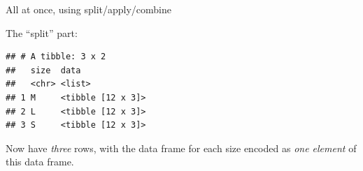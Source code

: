 \documentclass[
  ignorenonframetext,
]{beamer}
\newenvironment{Shaded}{\begin{snugshade}}{\end{snugshade}}
\newcommand{\KeywordTok}[1]{\textcolor[rgb]{0.13,0.29,0.53}{\textbf{#1}}}
\newcommand{\NormalTok}[1]{#1}
\newcommand{\OperatorTok}[1]{\textcolor[rgb]{0.81,0.36,0.00}{\textbf{#1}}}
\newcommand{\StringTok}[1]{\textcolor[rgb]{0.31,0.60,0.02}{#1}}
\begin{document}
\begin{frame}[fragile]{All at once, using split/apply/combine}
\protect\hypertarget{all-at-once-using-splitapplycombine}{}

The ``split'' part:

\begin{Shaded}
\end{Shaded}

\begin{verbatim}
## # A tibble: 3 x 2
##   size  data             
##   <chr> <list>           
## 1 M     <tibble [12 x 3]>
## 2 L     <tibble [12 x 3]>
## 3 S     <tibble [12 x 3]>
\end{verbatim}

Now have \emph{three} rows, with the data frame for each size encoded as
\emph{one element} of this data frame.

\end{frame}
\end{document}
